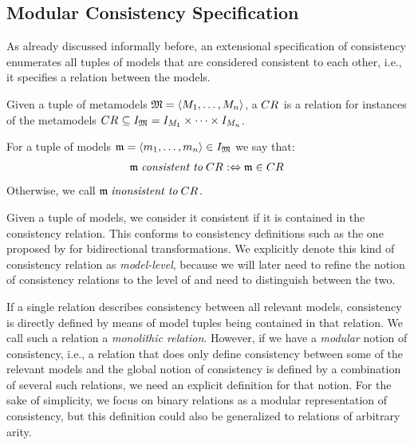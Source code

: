 \subsection{Modular Consistency Specification}

As already discussed informally before, an extensional specification of consistency enumerates all tuples of models that are considered consistent to each other, i.e., it specifies a relation between the models.

\begin{definition}[\ModelLevelConsistencyRelation]
    \label{def:modellevelconsistencyrelation}
    Given a tuple of metamodels $\mathfrak{M} = \langle M_{1}, \dots, M_{n} \rangle$, a \emph{\modellevelconsistencyrelation} $CR_{}$ is a relation for instances of the metamodels $CR_{} \subseteq I_{\mathfrak{M}} = I_{M_{1}} \times \dots \times I_{M_{n}}$.

    For a tuple of models $\mathfrak{m} = \langle m_{1}, \dots, m_{n} \rangle \in I_{\mathfrak{M}}$ we say that:
    \begin{align*}
        \mathfrak{m} \; \textit{consistent to} \; CR_{} :\Leftrightarrow \mathfrak{m} \in CR_{}
    \end{align*}
    Otherwise, we call $\mathfrak{m} \; \textit{inonsistent to} \; CR_{}$.
\end{definition}

Given a tuple of models, we consider it consistent if it is contained in the consistency relation.
This conforms to consistency definitions such as the one proposed by \textcite{stevens2010sosym} for bidirectional transformations.
We explicitly denote this kind of consistency relation as \emph{model-level}, because we will later need to refine the notion of consistency relations to the level of \metaclasses and need to distinguish between the two.

If a single relation describes consistency between all relevant models, consistency is directly defined by means of model tuples being contained in that relation. We call such a relation a \emph{monolithic relation}.
However, if we have a \emph{modular} notion of consistency, i.e., a relation that does only define consistency between some of the relevant models and the global notion of consistency is defined by a combination of several such relations, we need an explicit definition for that notion.
For the sake of simplicity, we focus on binary relations as a modular representation of consistency, but this definition could also be generalized to relations of arbitrary arity.


